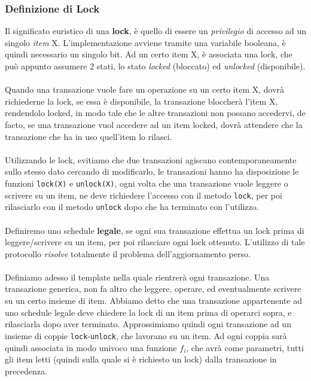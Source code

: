 \documentclass[12pt, letterpaper]{article}
\newcommand{\code}[1]{\colorbox{light-gray}{\texttt{#1}}}
\newcommand{\acc}{\\\hphantom{}\\}
\begin{document}
\subsubsection{Definizione di Lock}
Il significato euristico di una \textbf{lock}, è quello di essere un \textit{privilegio} di accesso ad un singolo 
\textit{item} X. L'implementazione avviene tramite una variabile booleana, è quindi necessario un singolo bit. Ad un certo 
item X, è associata una lock, che può appunto assumere 2 stati, lo stato \textit{locked} (bloccato) ed 
\textit{unlocked} (disponibile).\acc 
Quando una transazione vuole fare un operazione su un certo item X, dovrà richiederne la lock, se essa è disponibile, 
la transazione bloccherà l'item X, rendendolo locked, in modo tale che le altre transazioni non possano accedervi, de facto, 
se una transazione vuol accedere ad un item locked, dovrà attendere che la transazione che ha in uso quell'item lo rilasci.\acc 
Utilizzando le lock, evitiamo che due transazioni agiscano contemporaneamente sullo stesso dato cercando di modificarlo,
le transazioni hanno ha disposizione le funzioni \code{lock(X)} e \code{unlock(X)}, ogni volta che una transazione 
vuole leggere o scrivere su un item, ne deve richiedere l'accesso con il metodo \code{lock}, per poi rilasciarlo con il metodo \code{unlock} dopo 
che ha terminato con l'utilizzo.\acc 
Definiremo uno schedule \textbf{legale}, se ogni sua transazione effettua un lock prima di leggere/scrivere su un item,
per poi rilasciare ogni lock ottenuto. L'utilizzo di tale protocollo \textit{risolve} totalmente il problema dell'aggiornamento 
perso. \acc 
Definiamo adesso il template nella quale rientrerà ogni transazione. Una transazione generica, non fa altro che 
leggere, operare, ed eventualmente scrivere su un certo insieme di item. Abbiamo detto che una transazione appartenente 
ad uno schedule legale deve chiedere la lock di un item prima di operarci sopra, e rilasciarla dopo aver terminato.
Approssimiamo quindi ogni transazione ad un insieme di coppie \code{lock}-\code{unlock}, che lavorano su un item. Ad ogni coppia 
sarà quindi associata in modo univoco una funzione \(f_i\), che avrà come parametri, tutti gli item letti (quindi sulla quale 
si è richiesto un lock) dalla transazione in precedenza.
\begin{figure}[h]
\end{figure}\\
\end{document}

